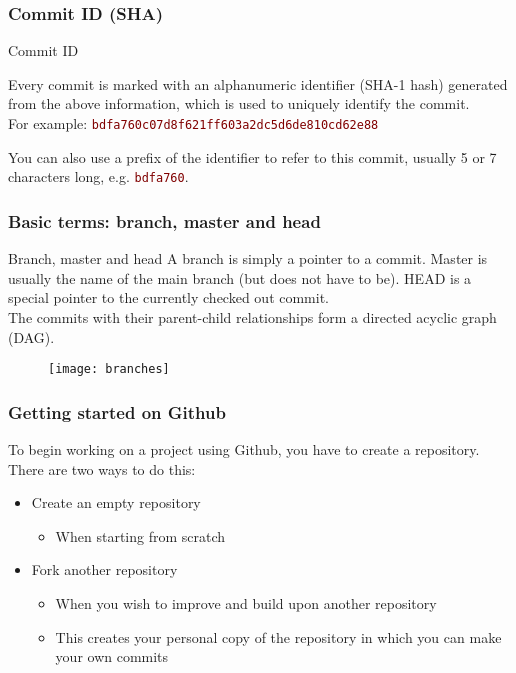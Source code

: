 \begin{frame}

\frametitle{Commit ID (SHA)}
\begin{block}{Commit ID}

	\smallskip Every commit is marked with an alphanumeric identifier (SHA-1 hash) generated from the above information, which is used to uniquely identify the commit. \\For example: \textcolor{Maroon}{\texttt{bdfa760c07d8f621ff603a2dc5d6de810cd62e88}}
\smallskip

You can also use a prefix of the identifier to refer to this commit, usually 5 or 7 characters long, e.g. \textcolor{Maroon}{\texttt{bdfa760}}.
\end{block}
\end{frame}


\begin{frame}

\frametitle{Basic terms: branch, master and head}

\begin{block}{Branch, master and head}
A \alert{branch} is simply a pointer to a commit. \alert{Master} is usually the name of the main branch (but does not have to be). \alert{HEAD} is a special pointer to the currently checked out commit. \\
\smallskip
The commits with their parent-child relationships form a directed acyclic graph (DAG).
\end{block}

\begin{figure}
\texttt{[image: branches]}
\end{figure}

\end{frame}


\begin{frame}

\frametitle{Getting started on Github}

To begin working on a project using Github, you have to create a repository. There are two ways to do this:


\begin{itemize}
	\item Create an empty repository
	\begin{itemize}
	\item When starting from scratch
	\end{itemize}	
	
	\medskip
	\item Fork another repository
	\begin{itemize}
	\item When you wish to improve and build upon another repository
	\item This creates your personal copy of the repository in which you can make your own commits
	\end{itemize}
\end{itemize}

\end{frame}

